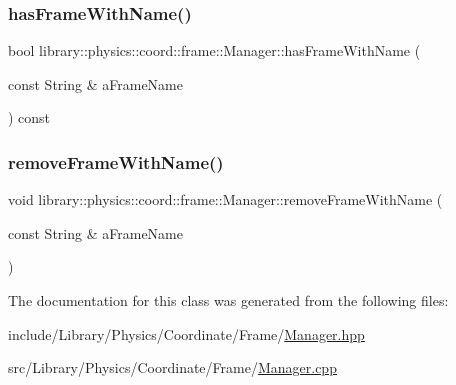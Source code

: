 \subsubsection{\texorpdfstring{has\+Frame\+With\+Name()}{hasFrameWithName()}}
{\footnotesize\ttfamily bool library\+::physics\+::coord\+::frame\+::\+Manager\+::has\+Frame\+With\+Name (\begin{DoxyParamCaption}\item[{const String \&}]{a\+Frame\+Name }\end{DoxyParamCaption}) const}

\mbox{\label{classlibrary_1_1physics_1_1coord_1_1frame_1_1_manager_a63e05e289d34f354dafefbff2b8478af}} 
\subsubsection{\texorpdfstring{remove\+Frame\+With\+Name()}{removeFrameWithName()}}
{\footnotesize\ttfamily void library\+::physics\+::coord\+::frame\+::\+Manager\+::remove\+Frame\+With\+Name (\begin{DoxyParamCaption}\item[{const String \&}]{a\+Frame\+Name }\end{DoxyParamCaption})}



The documentation for this class was generated from the following files\+:\begin{DoxyCompactItemize}
\item 
include/\+Library/\+Physics/\+Coordinate/\+Frame/\hyperlink{_manager_8hpp}{Manager.\+hpp}\item 
src/\+Library/\+Physics/\+Coordinate/\+Frame/\hyperlink{_manager_8cpp}{Manager.\+cpp}\end{DoxyCompactItemize}
